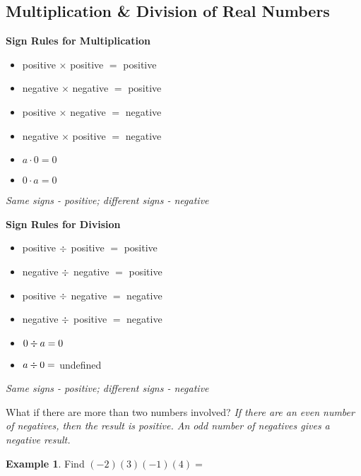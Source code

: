 \documentclass[addpoints,12pt]{exam}
\theoremstyle{definition}
\newtheorem{example}{Example}[subsection]
\begin{document}
\setcounter{section}{1}
\setcounter{subsection}{6}

\subsection{Multiplication \& Division of Real Numbers}

\vspace{.25in}

\begin{mdframed}
\textbf{Sign Rules for Multiplication}
\begin{itemize}
\item positive $\times$ positive $=$ positive
\item negative $\times$ negative $=$ positive
\item positive $\times$ negative $=$ negative
\item negative $\times$ positive $=$ negative
\item $a \cdot 0 = 0$
\item $0 \cdot a = 0$
\end{itemize}
\noindent \emph{Same signs - positive; different signs - negative}
\end{mdframed}
\vspace{.15in}

\begin{mdframed}
\textbf{Sign Rules for Division}
\begin{itemize}
\item positive $\divisionsymbol$ positive $=$ positive
\item negative $\divisionsymbol$ negative $=$ positive
\item positive $\divisionsymbol$ negative $=$ negative
\item negative $\divisionsymbol$ positive $=$ negative
\item $0 \divisionsymbol a = 0$
\item $a \divisionsymbol 0 = $ undefined
\end{itemize}
\noindent \emph{Same signs - positive; different signs - negative}
\end{mdframed}

\vspace{.15in}
\noindent What if there are more than two numbers involved? \emph{If there are an even number of negatives, then the result is positive. An odd number of negatives gives a negative result.}

\newpage

\begin{example}
Find $(-2)(3)(-1)(4) = $
\vspace{.5in}
\end{example}
\end{document}
